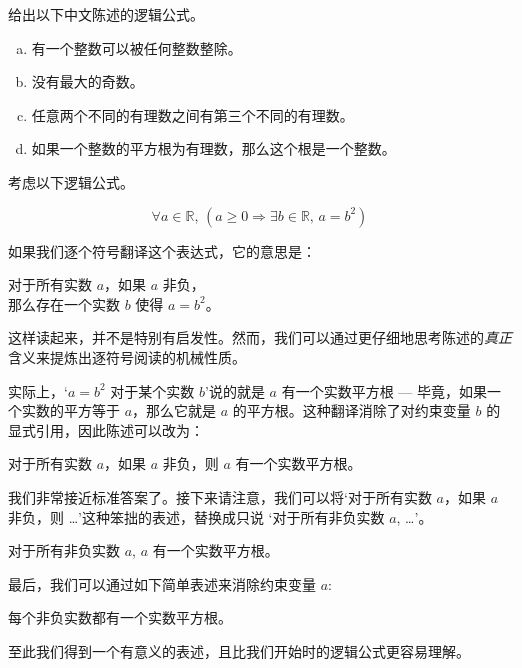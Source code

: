 \begin{exercise}
\label{exEnglishToLogicalFormulae}
给出以下中文陈述的逻辑公式。
\begin{enumerate}[(a)]
\item 有一个整数可以被任何整数整除。
\item 没有最大的奇数。
\item 任意两个不同的有理数之间有第三个不同的有理数。
\item 如果一个整数的平方根为有理数，那么这个根是一个整数。
\end{enumerate}
\end{exercise}

\begin{example}
考虑以下逻辑公式。

\[\forall a \in \mathbb{R},\, (a \ge 0 \Rightarrow \exists b \in \mathbb{R},\, a = b^2)\]

如果我们逐个符号翻译这个表达式，它的意思是：
\begin{center}
对于所有实数 $a$，如果 $a$ 非负，\\
那么存在一个实数 $b$ 使得 $a=b^2$。
\end{center}

这样读起来，并不是特别有启发性。然而，我们可以通过更仔细地思考陈述的\textit{真正}含义来提炼出逐符号阅读的机械性质。

实际上，`$a = b^2$ 对于某个实数 $b$'说的就是 $a$ 有一个实数平方根 --- 毕竟，如果一个实数的平方等于 $a$，那么它就是 $a$ 的平方根。这种翻译消除了对约束变量 $b$ 的显式引用，因此陈述可以改为：

\begin{center}
对于所有实数 $a$，如果 $a$ 非负，则 $a$ 有一个实数平方根。
\end{center}

我们非常接近标准答案了。接下来请注意，我们可以将`对于所有实数 $a$，如果 $a$ 非负，则 \dots{}'这种笨拙的表述，替换成只说 `对于所有非负实数 $a$, \dots{}'。

\begin{center}
对于所有非负实数 $a$, $a$ 有一个实数平方根。
\end{center}

最后，我们可以通过如下简单表述来消除约束变量 $a$: 

\begin{center}
每个非负实数都有一个实数平方根。
\end{center}
至此我们得到一个有意义的表述，且比我们开始时的逻辑公式更容易理解。
\end{example}

